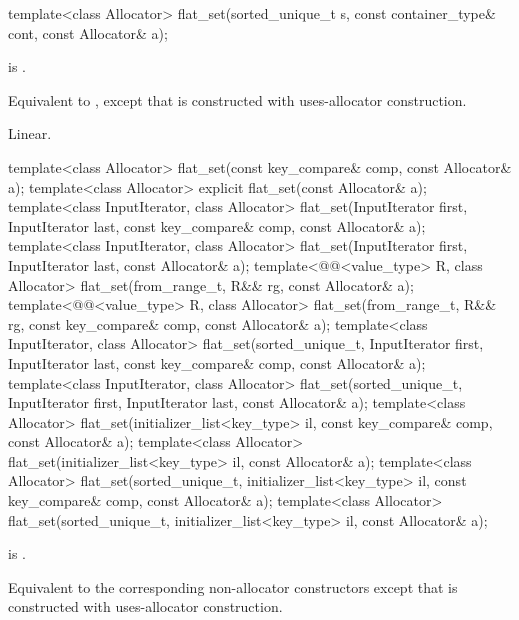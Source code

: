 %
\begin{itemdecl}
template<class Allocator>
  flat_set(sorted_unique_t s, const container_type& cont, const Allocator& a);
\end{itemdecl}

\begin{itemdescr}
\pnum
\constraints
{} is .

\pnum
\effects
Equivalent to ,
except that  is constructed with
uses-allocator construction.

\pnum
\complexity
Linear.
\end{itemdescr}

%
\begin{itemdecl}
template<class Allocator>
  flat_set(const key_compare& comp, const Allocator& a);
template<class Allocator>
  explicit flat_set(const Allocator& a);
template<class InputIterator, class Allocator>
  flat_set(InputIterator first, InputIterator last, const key_compare& comp, const Allocator& a);
template<class InputIterator, class Allocator>
  flat_set(InputIterator first, InputIterator last, const Allocator& a);
template<@@<value_type> R, class Allocator>
  flat_set(from_range_t, R&& rg, const Allocator& a);
template<@@<value_type> R, class Allocator>
  flat_set(from_range_t, R&& rg, const key_compare& comp, const Allocator& a);
template<class InputIterator, class Allocator>
  flat_set(sorted_unique_t, InputIterator first, InputIterator last,
           const key_compare& comp, const Allocator& a);
template<class InputIterator, class Allocator>
  flat_set(sorted_unique_t, InputIterator first, InputIterator last, const Allocator& a);
template<class Allocator>
  flat_set(initializer_list<key_type> il, const key_compare& comp, const Allocator& a);
template<class Allocator>
  flat_set(initializer_list<key_type> il, const Allocator& a);
template<class Allocator>
  flat_set(sorted_unique_t, initializer_list<key_type> il,
           const key_compare& comp, const Allocator& a);
template<class Allocator>
  flat_set(sorted_unique_t, initializer_list<key_type> il, const Allocator& a);
\end{itemdecl}

\begin{itemdescr}
\pnum
\constraints
{} is .

\pnum
\effects
Equivalent to the corresponding non-allocator constructors
except that  is constructed with
uses-allocator construction.
\end{itemdescr}

